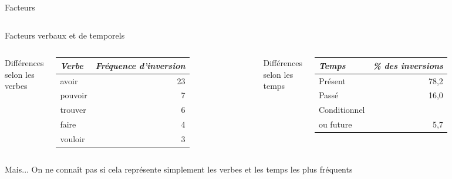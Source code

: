 \documentclass{beamer}
\begin{document}
\begin{frame}[t]{Facteurs}
\begin{columns}
      \end{columns}
    \end{frame}

    \begin{frame}[t]{Facteurs verbaux et de temporels}
      \begin{columns}
          \begin{minipage}[t][0.6\textheight]{\linewidth}
            \begin{block}{}
              Différences selon les verbes\phantom{p}
            \end{block}
            \begin{tabular}{l r}
              \emph{Verbe} & \emph{Fréquence d'inversion} \\
              \hline
              avoir        & 23 \\
              pouvoir      & 7 \\
              trouver      & 6 \\
              faire        & 4 \\
              vouloir      & 3
            \end{tabular}
          \end{minipage}
          \begin{minipage}[t][0.6\textheight]{\linewidth}
            \begin{block}{}
              Différences selon les temps
            \end{block}
            \begin{tabular}{l r}
              \emph{Temps} & \emph{\% des inversions} \\
              \hline
              Présent      & 78,2 \\
              Passé        & 16,0 \\
              Conditionnel & \\
              ou future    & 5,7
            \end{tabular}
          \end{minipage}
      \end{columns}
      \begin{block}{Mais...}
        On ne connaît pas si cela représente simplement les verbes et les temps les plus fréquents
      \end{block}
    \end{frame}
\end{document}
